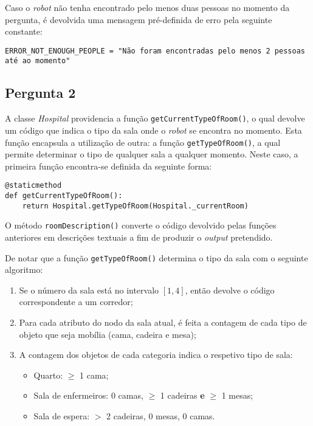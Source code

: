 Caso o \textit{robot} não tenha encontrado pelo menos duas pessoas no momento da pergunta, é devolvida uma mensagem pré-definida de erro pela seguinte constante:

\texttt{ERROR_NOT_ENOUGH_PEOPLE = "Não foram encontradas pelo menos 2 pessoas até ao momento"}


\subsection{Pergunta 2}
\label{ssec::implement:details:perg2}


A classe \textit{Hospital} providencia a função \texttt{getCurrentTypeOfRoom()}, o qual devolve um código que indica o tipo da sala onde o \textit{robot} se encontra no momento. Esta função encapsula a utilização de outra: a função \texttt{getTypeOfRoom()}, a qual permite determinar o tipo de qualquer sala a qualquer momento. Neste caso, a primeira função encontra-se definida da seguinte forma:

\begin{verbatim}
@staticmethod
def getCurrentTypeOfRoom():
    return Hospital.getTypeOfRoom(Hospital._currentRoom)
\end{verbatim}

O método \texttt{roomDescription()} converte o código devolvido pelas funções anteriores em descrições textuais a fim de produzir o \textit{output} pretendido.

De notar que a função \texttt{getTypeOfRoom()} determina o tipo da sala com o seguinte algoritmo:

\begin{enumerate}
    \item Se o número da sala está no intervalo $[1, 4]$, então devolve o código correspondente a um corredor;
    \item Para cada atributo do nodo da sala atual, é feita a contagem de cada tipo de objeto que seja mobília (cama, cadeira e mesa);
    \item A contagem dos objetos de cada categoria indica o respetivo tipo de sala:
    \begin{itemize}
        \item Quarto: $\geq$ 1 cama;
        \item Sala de enfermeiros: 0 camas, $\geq$ 1 cadeiras \textbf{e} $\geq$ 1 mesas;
        \item Sala de espera: $>$ 2 cadeiras, 0 mesas, 0 camas.
    \end{itemize}
\end{enumerate}


